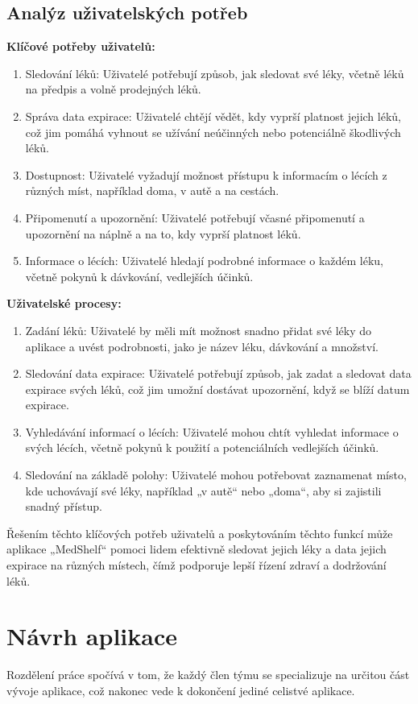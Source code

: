 \documentclass[a4paper, 11pt]{article}
\begin{document}
	\subsection{Analýz uživatelských potřeb}
	\textbf{Klíčové potřeby uživatelů:}
 \begin{enumerate}
     \item Sledování léků: Uživatelé potřebují způsob, jak sledovat své léky, včetně léků na předpis a volně prodejných léků.
     \item Správa data expirace: Uživatelé chtějí vědět, kdy vyprší platnost jejich léků, což jim pomáhá vyhnout se užívání neúčinných nebo potenciálně škodlivých léků.
     \item Dostupnost: Uživatelé vyžadují možnost přístupu k informacím o lécích z různých míst, například doma, v autě a na cestách.
     \item Připomenutí a upozornění: Uživatelé potřebují včasné připomenutí a upozornění na náplně a na to, kdy vyprší platnost léků.
     \item Informace o lécích: Uživatelé hledají podrobné informace o každém léku, včetně pokynů k dávkování, vedlejších účinků.
 \end{enumerate}
\textbf{Uživatelské procesy:}
\begin{enumerate}
    \item Zadání léků: Uživatelé by měli mít možnost snadno přidat své léky do aplikace a uvést podrobnosti, jako je název léku, dávkování a množství.
    \item Sledování data expirace: Uživatelé potřebují způsob, jak zadat a sledovat data expirace svých léků, což jim umožní dostávat upozornění, když se blíží datum expirace.
    \item Vyhledávání informací o lécích: Uživatelé mohou chtít vyhledat informace o svých lécích, včetně pokynů k použití a potenciálních vedlejších účinků.
    \item Sledování na základě polohy: Uživatelé mohou potřebovat zaznamenat místo, kde uchovávají své léky, například „v autě“ nebo „doma“, aby si zajistili snadný přístup.
\end{enumerate}
Řešením těchto klíčových potřeb uživatelů a poskytováním těchto funkcí může aplikace „MedShelf“ pomoci lidem efektivně sledovat jejich léky a data jejich expirace na různých místech, čímž podporuje lepší řízení zdraví a dodržování léků.

    \section{Návrh aplikace}
Rozdělení práce spočívá v tom, že každý člen týmu se specializuje na určitou část vývoje aplikace, což nakonec vede k dokončení jediné celistvé aplikace.
\end{document}
